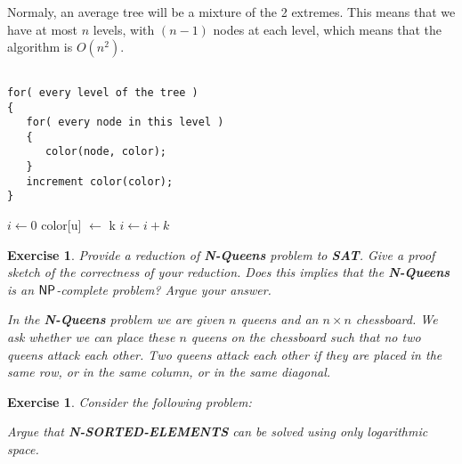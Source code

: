 \documentclass [11pt]{article}
\newenvironment{mylisting}
{\begin{list}{}{\setlength{\leftmargin}{1em}}\item\scriptsize\bfseries}
{\end{list}}
\newtheorem{exercise}[theorem]{Exercise}
\newcommand{\ccfont}[1]{\protect\mathsf{#1}}
\newcommand{\NP}{\ccfont{NP}}
\newcommand{\solution}[1]{\noindent {\bf Solution.}  #1}
\begin{document}
Normaly, an average tree will be a mixture of the 2 extremes. This means that we have at most $n$ levels, with $(n-1)$ nodes at each level, which means that the algorithm is $O(n^2)$.  

\begin{mylisting}
\begin{verbatim}

for( every level of the tree )
{
   for( every node in this level )
   {
      color(node, color);
   }
   increment color(color);
}

\end{verbatim}
\end{mylisting}

\begin{algorithmic}
    \State $i\gets 0$
    color[u] $\gets$ k
        \State $i\gets i+k$
    \EndIf
\EndFor
\EndFunction
\end{algorithmic}


\begin{exercise}
  \label{ex:Nqueens}
  Provide a reduction of \textbf{N-Queens} problem to \textbf{SAT}. Give a proof sketch of the correctness of your reduction. Does this implies that the \textbf{N-Queens} is an $\NP$-complete problem? Argue your answer.  
  
  \smallskip 
  
\noindent In the \textbf{N-Queens} problem we are given $n$ queens and an $n \times n$ chessboard. We ask whether we can place these $n$ queens on the  chessboard such that no two queens attack each other. Two queens attack each other if they are placed in the same row, or in the same column, or in the same diagonal.    
       
   
\end{exercise}




\begin{exercise}
  Consider the following problem:
  \begin{center}
  \end{center}

  \medskip Argue that \textbf{N-SORTED-ELEMENTS} can be solved using only logarithmic
  space.
\end{exercise}
\end{document}
